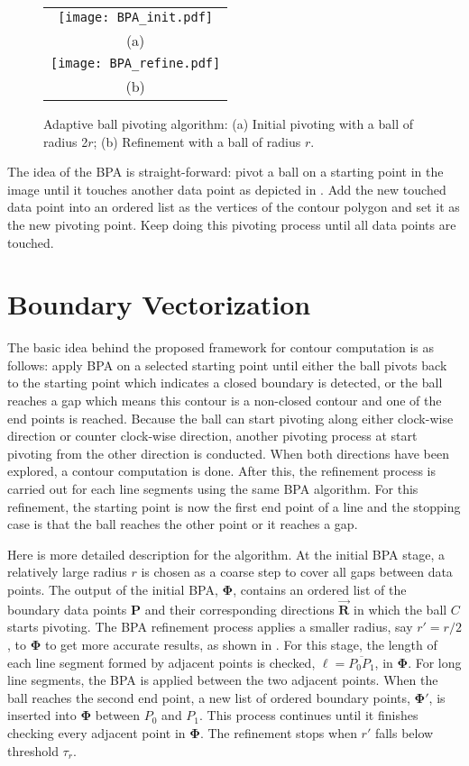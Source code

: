 \begin{figure*}[hbtp]
\begin{center}
\begin{tabular}{c}
\texttt{[image: BPA\_init.pdf]} \\
(a) \\
\texttt{[image: BPA\_refine.pdf]} \\
(b)
\end{tabular}
\end{center}
\caption{Adaptive ball pivoting algorithm:
(a) Initial pivoting with a ball of radius 2$r$;
(b) Refinement with a ball of radius $r$.}
\label{fig:BPA}
\end{figure*}


The idea of the BPA is straight-forward:
pivot a ball on a starting point in the image
until it touches another data point as depicted in .
Add the new touched
data point into an ordered list as the vertices of the contour polygon and
set it as the new pivoting point.
Keep doing this pivoting process until all data points are touched.

\section{Boundary Vectorization}
The basic idea behind the proposed framework for contour computation is as follows:
apply BPA on a selected starting point until
either the ball pivots back to the starting point which indicates a closed boundary is detected,
or the ball reaches a gap which means this contour is a non-closed
contour and one of the end points is reached.
Because the ball can start pivoting along either clock-wise direction or counter clock-wise direction,
another pivoting process at start pivoting from the other direction is conducted.
When both directions have been explored, a contour computation is done.
After this, the refinement process is carried out for each line segments using the same BPA algorithm.
For this refinement, the starting point is now the first end point of a line
and the stopping case is that the ball reaches the other point or it
reaches a gap.

Here is more detailed description for the algorithm.
At the initial BPA stage, a relatively large radius $r$ is chosen as a coarse step to cover all gaps between data points.
The output of the initial BPA, $\boldsymbol{\Phi}$, contains an ordered list of the boundary data
points $\boldsymbol{P}$ and their corresponding directions $\overrightarrow{\boldsymbol{R}}$ in which
the ball $C$ starts pivoting.
The BPA refinement process applies a smaller radius, say $r' = r/2$,
to $\boldsymbol{\Phi}$ to get more accurate results, as shown in .
For this stage, the length of each line segment formed by adjacent points is checked,
$\ell = \overline{P_0P_1}$, in $\boldsymbol{\Phi}$.
For long line segments, the BPA is applied between the two adjacent points.
When the ball reaches the second end point, a new list of ordered boundary points,
$\boldsymbol{\Phi'}$, is inserted into $\boldsymbol{\Phi}$ between $P_0$ and
$P_1$.
This process continues until it finishes checking every adjacent point in $\boldsymbol{\Phi}$.
The refinement stops when $r'$ falls below threshold $\tau_r$.

